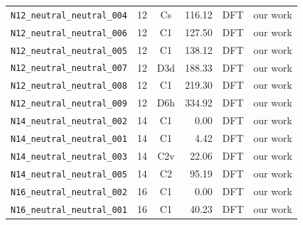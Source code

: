 {\begin{longtable}{@{}p{4.7cm}ccrcp{1.6cm}@{}}
\texttt{N12\_neutral\_neutral\_004} & 12 & Cs & 116.12 & DFT & our work \\
\texttt{N12\_neutral\_neutral\_006} & 12 & C1 & 127.50 & DFT & our work \\
\texttt{N12\_neutral\_neutral\_005} & 12 & C1 & 138.12 & DFT & our work \\
\texttt{N12\_neutral\_neutral\_007} & 12 & D3d & 188.33 & DFT & our work \\
\texttt{N12\_neutral\_neutral\_008} & 12 & C1 & 219.30 & DFT & our work \\
\texttt{N12\_neutral\_neutral\_009} & 12 & D6h & 334.92 & DFT & our work \\
\addlinespace
\texttt{N14\_neutral\_neutral\_002} & 14 & C1 & 0.00 & DFT & our work \\
\texttt{N14\_neutral\_neutral\_001} & 14 & C1 & 4.42 & DFT & our work \\
\texttt{N14\_neutral\_neutral\_003} & 14 & C2v & 22.06 & DFT & our work \\
\texttt{N14\_neutral\_neutral\_005} & 14 & C2 & 95.19 & DFT & our work \\
\addlinespace
\texttt{N16\_neutral\_neutral\_002} & 16 & C1 & 0.00 & DFT & our work \\
\texttt{N16\_neutral\_neutral\_001} & 16 & C1 & 40.23 & DFT & our work \\
\end{longtable}
}
